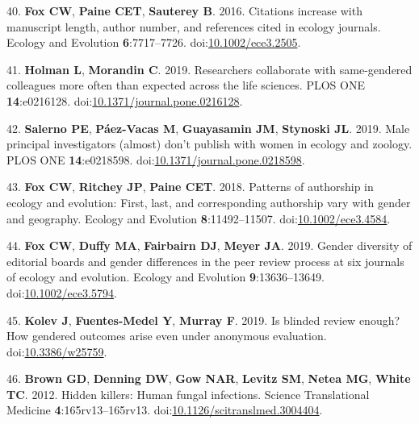 \documentclass[11pt,]{article}
\begin{document}
\leavevmode\hypertarget{ref-fox_citations_2016}{}%
40. \textbf{Fox CW}, \textbf{Paine CET}, \textbf{Sauterey B}. 2016.
Citations increase with manuscript length, author number, and references
cited in ecology journals. Ecology and Evolution \textbf{6}:7717--7726.
doi:\href{https://doi.org/10.1002/ece3.2505}{10.1002/ece3.2505}.

\leavevmode\hypertarget{ref-holman_researchers_2019}{}%
41. \textbf{Holman L}, \textbf{Morandin C}. 2019. Researchers
collaborate with same-gendered colleagues more often than expected
across the life sciences. PLOS ONE \textbf{14}:e0216128.
doi:\href{https://doi.org/10.1371/journal.pone.0216128}{10.1371/journal.pone.0216128}.

\leavevmode\hypertarget{ref-Salerno2019}{}%
42. \textbf{Salerno PE}, \textbf{Páez-Vacas M}, \textbf{Guayasamin JM},
\textbf{Stynoski JL}. 2019. Male principal investigators (almost) don't
publish with women in ecology and zoology. PLOS ONE
\textbf{14}:e0218598.
doi:\href{https://doi.org/10.1371/journal.pone.0218598}{10.1371/journal.pone.0218598}.

\leavevmode\hypertarget{ref-Fox2018}{}%
43. \textbf{Fox CW}, \textbf{Ritchey JP}, \textbf{Paine CET}. 2018.
Patterns of authorship in ecology and evolution: First, last, and
corresponding authorship vary with gender and geography. Ecology and
Evolution \textbf{8}:11492--11507.
doi:\href{https://doi.org/10.1002/ece3.4584}{10.1002/ece3.4584}.

\leavevmode\hypertarget{ref-Fox2019}{}%
44. \textbf{Fox CW}, \textbf{Duffy MA}, \textbf{Fairbairn DJ},
\textbf{Meyer JA}. 2019. Gender diversity of editorial boards and gender
differences in the peer review process at six journals of ecology and
evolution. Ecology and Evolution \textbf{9}:13636--13649.
doi:\href{https://doi.org/10.1002/ece3.5794}{10.1002/ece3.5794}.

\leavevmode\hypertarget{ref-Kolev2019}{}%
45. \textbf{Kolev J}, \textbf{Fuentes-Medel Y}, \textbf{Murray F}. 2019.
Is blinded review enough? How gendered outcomes arise even under
anonymous evaluation.
doi:\href{https://doi.org/10.3386/w25759}{10.3386/w25759}.

\leavevmode\hypertarget{ref-Brown2012}{}%
46. \textbf{Brown GD}, \textbf{Denning DW}, \textbf{Gow NAR},
\textbf{Levitz SM}, \textbf{Netea MG}, \textbf{White TC}. 2012. Hidden
killers: Human fungal infections. Science Translational Medicine
\textbf{4}:165rv13--165rv13.
doi:\href{https://doi.org/10.1126/scitranslmed.3004404}{10.1126/scitranslmed.3004404}.
\end{document}
